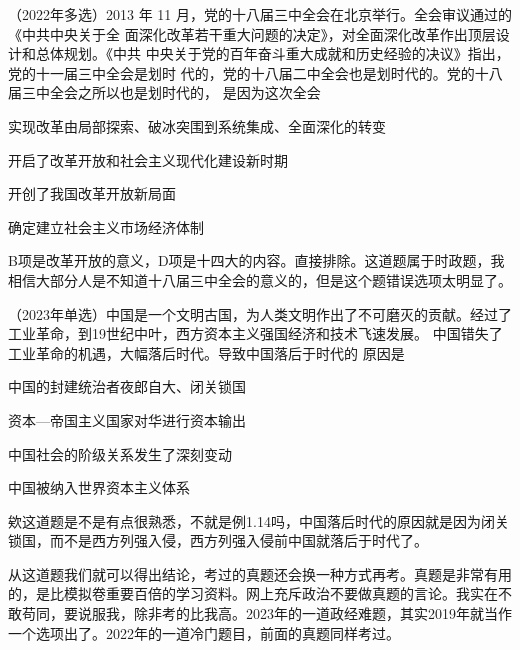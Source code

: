 \documentclass[lang=cn,newtx,10pt,scheme=chinese,pad,twocol]{zznote}
\begin{document}
\begin{example} （2022年多选）2013 年 11 月，党的十八届三中全会在北京举行。全会审议通过的《中共中央关于全
	面深化改革若干重大问题的决定》，对全面深化改革作出顶层设计和总体规划。《中共
	中央关于党的百年奋斗重大成就和历史经验的决议》指出，党的十一届三中全会是划时
	代的，党的十八届二中全会也是划时代的。党的十八届三中全会之所以也是划时代的，
	是因为这次全会
	\begin{choice}
		\item 实现改革由局部探索、破冰突围到系统集成、全面深化的转变
		\item 开启了改革开放和社会主义现代化建设新时期
		\item 开创了我国改革开放新局面
		\item 确定建立社会主义市场经济体制
	\end{choice}
\end{example}
\begin{solution}
	B项是改革开放的意义，D项是十四大的内容。直接排除。这道题属于时政题，我相信大部分人是不知道十八届三中全会的意义的，但是这个题错误选项太明显了。
\end{solution}
\begin{example}	（2023年单选）中国是一个文明古国，为人类文明作出了不可磨灭的贡献。经过了 工业革命，到19世纪中叶，西方资本主义强国经济和技术飞速发展。 中国错失了工业革命的机遇，大幅落后时代。导致中国落后于时代的
	原因是

	\begin{choice}
		\item 中国的封建统治者夜郎自大、闭关锁国
		\item 资本—帝国主义国家对华进行资本输出
		\item 中国社会的阶级关系发生了深刻变动
		\item 中国被纳入世界资本主义体系
	\end{choice}
\end{example}
\begin{solution}
	欸这道题是不是有点很熟悉，不就是例1.14吗，中国落后时代的原因就是因为闭关锁国，而不是西方列强入侵，西方列强入侵前中国就落后于时代了。
\end{solution}
\begin{postulate}
	从这道题我们就可以得出结论，考过的真题还会换一种方式再考。真题是非常有用的，是比模拟卷重要百倍的学习资料。网上充斥政治不要做真题的言论。我实在不敢苟同，要说服我，除非考的比我高。2023年的一道政经难题，其实2019年就当作一个选项出了。2022年的一道冷门题目，前面的真题同样考过。
\end{postulate}
\end{document}
